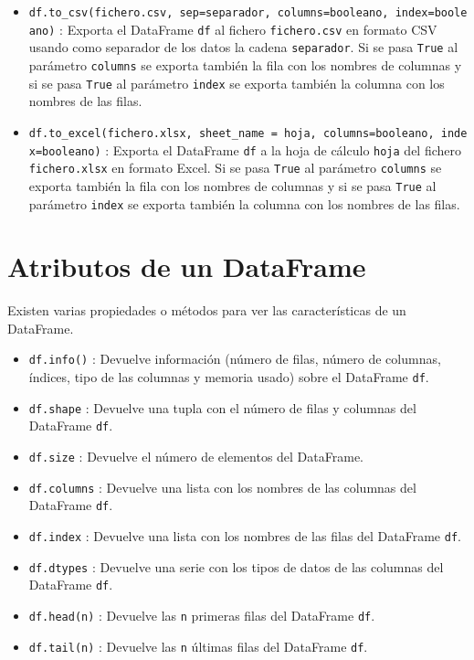 \documentclass[
  spanish,
  a4paper,
]{scrreport}
\begin{document}
\begin{itemize}
\item
  \texttt{df.to\_csv(fichero.csv,\ sep=separador,\ columns=booleano,\ index=booleano)}
  : Exporta el DataFrame \texttt{df} al fichero \texttt{fichero.csv} en
  formato CSV usando como separador de los datos la cadena
  \texttt{separador}. Si se pasa \texttt{True} al parámetro
  \texttt{columns} se exporta también la fila con los nombres de
  columnas y si se pasa \texttt{True} al parámetro \texttt{index} se
  exporta también la columna con los nombres de las filas.
\item
  \texttt{df.to\_excel(fichero.xlsx,\ sheet\_name\ =\ hoja,\ columns=booleano,\ index=booleano)}
  : Exporta el DataFrame \texttt{df} a la hoja de cálculo \texttt{hoja}
  del fichero \texttt{fichero.xlsx} en formato Excel. Si se pasa
  \texttt{True} al parámetro \texttt{columns} se exporta también la fila
  con los nombres de columnas y si se pasa \texttt{True} al parámetro
  \texttt{index} se exporta también la columna con los nombres de las
  filas.
\end{itemize}

\section{Atributos de un DataFrame}\label{atributos-de-un-dataframe}

Existen varias propiedades o métodos para ver las características de un
DataFrame.

\begin{itemize}
\item
  \texttt{df.info()} : Devuelve información (número de filas, número de
  columnas, índices, tipo de las columnas y memoria usado) sobre el
  DataFrame \texttt{df}.
\item
  \texttt{df.shape} : Devuelve una tupla con el número de filas y
  columnas del DataFrame \texttt{df}.
\item
  \texttt{df.size} : Devuelve el número de elementos del DataFrame.
\item
  \texttt{df.columns} : Devuelve una lista con los nombres de las
  columnas del DataFrame \texttt{df}.
\item
  \texttt{df.index} : Devuelve una lista con los nombres de las filas
  del DataFrame \texttt{df}.
\item
  \texttt{df.dtypes} : Devuelve una serie con los tipos de datos de las
  columnas del DataFrame \texttt{df}.
\item
  \texttt{df.head(n)} : Devuelve las \texttt{n} primeras filas del
  DataFrame \texttt{df}.
\item
  \texttt{df.tail(n)} : Devuelve las \texttt{n} últimas filas del
  DataFrame \texttt{df}.
\end{itemize}
\end{document}
